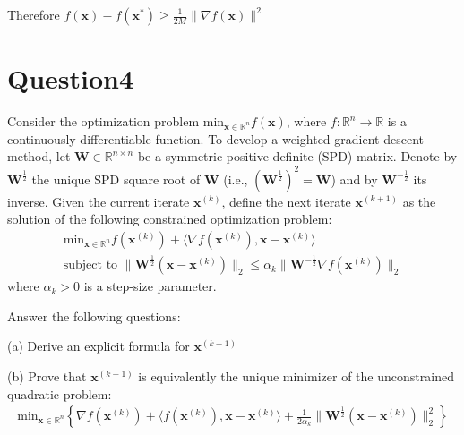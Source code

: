 \documentclass{article}
\newcommand{\R}{\mathbb{R}}
\begin{document}
Therefore \(f(\bm{x}) - f(\bm{x}^*) \geq \frac{1}{2M}\|\nabla f(\bm{x})\|^2\)

\section*{Question4}
Consider the optimization problem \(\text{min}_{\bm{x} \in \R^n} f(\bm{x})\), where \(f: \R^n \to \R\) is a continuously differentiable function. To develop a weighted gradient descent method, let \(\bm{W} \in \R^{n \times n}\) be a symmetric positive definite (SPD) matrix. Denote by \(\bm{W}^{\frac{1}{2}}\) the unique SPD square root of \(\bm{W}\) (i.e., \((\bm{W}^{\frac{1}{2}})^2 = \bm{W}\)) and by \(\bm{W}^{-\frac{1}{2}}\) its inverse. Given the current iterate \(\bm{x}^{(k)}\), define the next iterate \(\bm{x}^{(k + 1)}\) as the solution of the following constrained optimization problem:
\begin{align*}
    \text{min}_{\bm{x} \in \R^n}f(\bm{x}^{(k)}) + \langle \nabla f(\bm{x}^{(k)}), \bm{x} - \bm{x}^{(k)}\rangle \\
    \text{subject to } \|\bm{W}^{\frac{1}{2}} (\bm{x} - \bm{x}^(k))\|_2 \leq \alpha_k\|\bm{W}^{-\frac{1}{2}} \nabla f(\bm{x}^(k))\|_2
\end{align*}
where  \(\alpha_k > 0\) is a step-size parameter.

Answer the following questions:

(a) Derive an explicit formula for \(\bm{x}^{(k + 1)}\)

(b) Prove that \(\bm{x}^{(k + 1)}\) is equivalently the unique minimizer of the unconstrained quadratic problem:
\begin{align*}
    \text{min}_{\bm{x} \in \R^n} \left \{ \nabla f(\bm{x}^{(k)}) + \langle f(\bm{x}^{(k)}), \bm{x} - \bm{x}^{(k)} \rangle + \frac{1}{2\alpha_k} \|\bm{W}^{\frac{1}{2}} (\bm{x} - \bm{x}^{(k)})\|_2^2 \right \}
\end{align*}
\end{document}
